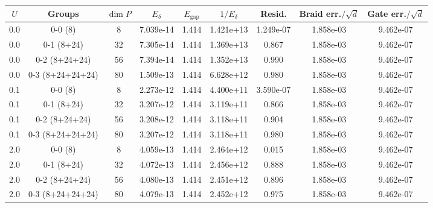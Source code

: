 \begin{tabular}{ccccccccc}
\hline
$U$ & Groups & $\dim P$ & $E_\delta$ & $E_{\mathrm{gap}}$ & $1/E_\delta$ & Resid. & Braid err.$/\sqrt{d}$ & Gate err.$/\sqrt{d}$ \\
\hline
0.0 & 0-0 (8) & 8 & 7.039e-14 & 1.414 & 1.421e+13 & 1.249e-07 & 1.858e-03 & 9.462e-07 \\
0.0 & 0-1 (8+24) & 32 & 7.305e-14 & 1.414 & 1.369e+13 & 0.867 & 1.858e-03 & 9.462e-07 \\
0.0 & 0-2 (8+24+24) & 56 & 7.394e-14 & 1.414 & 1.352e+13 & 0.990 & 1.858e-03 & 9.462e-07 \\
0.0 & 0-3 (8+24+24+24) & 80 & 1.509e-13 & 1.414 & 6.628e+12 & 0.980 & 1.858e-03 & 9.462e-07 \\
0.1 & 0-0 (8) & 8 & 2.273e-12 & 1.414 & 4.400e+11 & 3.590e-07 & 1.858e-03 & 9.462e-07 \\
0.1 & 0-1 (8+24) & 32 & 3.207e-12 & 1.414 & 3.119e+11 & 0.866 & 1.858e-03 & 9.462e-07 \\
0.1 & 0-2 (8+24+24) & 56 & 3.208e-12 & 1.414 & 3.118e+11 & 0.904 & 1.858e-03 & 9.462e-07 \\
0.1 & 0-3 (8+24+24+24) & 80 & 3.207e-12 & 1.414 & 3.118e+11 & 0.980 & 1.858e-03 & 9.462e-07 \\
2.0 & 0-0 (8) & 8 & 4.059e-13 & 1.414 & 2.464e+12 & 0.015 & 1.858e-03 & 9.462e-07 \\
2.0 & 0-1 (8+24) & 32 & 4.072e-13 & 1.414 & 2.456e+12 & 0.888 & 1.858e-03 & 9.462e-07 \\
2.0 & 0-2 (8+24+24) & 56 & 4.080e-13 & 1.414 & 2.451e+12 & 0.896 & 1.858e-03 & 9.462e-07 \\
2.0 & 0-3 (8+24+24+24) & 80 & 4.079e-13 & 1.414 & 2.452e+12 & 0.975 & 1.858e-03 & 9.462e-07 \\
\hline
\end{tabular}
